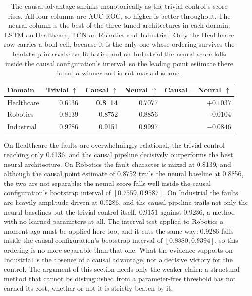 \begin{table}[htbp]
\centering
\caption[The causal advantage shrinks monotonically as the trivial control's score rises]{The causal advantage shrinks monotonically as the trivial control's score rises. All four columns are AUC-ROC, so higher is better throughout. The neural column is the best of the three tuned architectures in each domain: LSTM on Healthcare, TCN on Robotics and Industrial. Only the Healthcare row carries a bold cell, because it is the only one whose ordering survives the bootstrap intervals: on Robotics and on Industrial the neural score falls inside the causal configuration's interval, so the leading point estimate there is not a winner and is not marked as one.}
\label{tab:causal-advantage}
\begin{tabular}{lrrrr}
\toprule
Domain & Trivial $\uparrow$ & Causal $\uparrow$ & Neural $\uparrow$ & Causal $-$ Neural $\uparrow$ \\
\midrule
Healthcare & 0.6136 & \textbf{0.8114} & 0.7077 & $\mathbf{+0.1037}$ \\
Robotics   & 0.8139 & 0.8752 & 0.8856 & $-0.0104$ \\
Industrial & 0.9286 & 0.9151 & 0.9997 & $-0.0846$ \\
\bottomrule
\end{tabular}
\end{table}

On Healthcare the faults are overwhelmingly relational, the trivial control reaching only 0.6136, and the causal pipeline decisively outperforms the best neural architecture. On Robotics the fault character is mixed at 0.8139, and although the causal point estimate of 0.8752 trails the neural baseline at 0.8856, the two are not separable: the neural score falls well inside the causal configuration's bootstrap interval of $[0.7559, 0.9587]$. On Industrial the faults are heavily amplitude-driven at 0.9286, and the causal pipeline trails not only the neural baselines but the trivial control itself, 0.9151 against 0.9286, a method with no learned parameters at all. The interval test applied to Robotics a moment ago must be applied here too, and it cuts the same way: 0.9286 falls inside the causal configuration's bootstrap interval of $[0.8880, 0.9394]$, so this ordering is no more separable than that one. What the evidence supports on Industrial is the absence of a causal advantage, not a decisive victory for the control. The argument of this section needs only the weaker claim: a structural method that cannot be distinguished from a parameter-free threshold has not earned its cost, whether or not it is strictly beaten by it.

